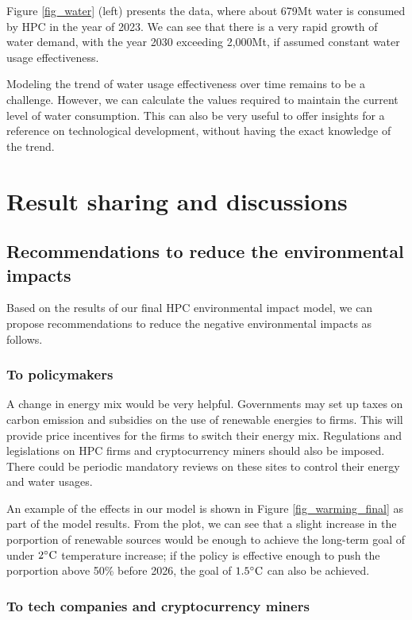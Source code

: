 \documentclass[12pt]{article}
\begin{document}
Figure \ref{fig_water} (left) presents the data, where about 679Mt water is consumed by HPC in the year of 2023. We can see that there is a very rapid growth of water demand, with the year 2030 exceeding 2,000Mt, if assumed constant water usage effectiveness.

Modeling the trend of water usage effectiveness over time remains to be a challenge. However, we can calculate the values required to maintain the current level of water consumption. This can also be very useful to offer insights for a reference on technological development, without having the exact knowledge of the trend.

\section{Result sharing and discussions}

\subsection{Recommendations to reduce the environmental impacts}

Based on the results of our final HPC environmental impact model, we can propose recommendations to reduce the negative environmental impacts as follows.

\subsubsection{To policymakers}

A change in energy mix would be very helpful. Governments may set up taxes on carbon emission and subsidies on the use of renewable energies to firms. This will provide price incentives for the firms to switch their energy mix. Regulations and legislations on HPC firms and cryptocurrency miners should also be imposed. There could be periodic mandatory reviews on these sites to control their energy and water usages.

An example of the effects in our model is shown in Figure \ref{fig_warming_final} as part of the model results. From the plot, we can see that a slight increase in the porportion of renewable sources would be enough to achieve the long-term goal of under $2 \rm ^\circ C$ temperature increase; if the policy is effective enough to push the porportion above 50\% before 2026, the goal of $1.5 \rm ^\circ C$ can also be achieved.

\subsubsection{To tech companies and cryptocurrency miners}
\end{document}
